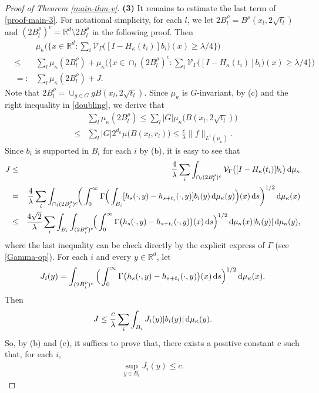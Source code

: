 \documentclass[11pt,a4paper]{article}
\def\R{\mathbb{R}}
\def\d{\textup{d}}
\theoremstyle{definition}\newtheorem{remark}[theorem]{Remark}
\begin{document}
\begin{proof}[Proof of Theorem \ref{main-thm-v}]
\textbf{(3)} It remains to estimate the last term of \eqref{proof-main-3}. For notational simplicity, for each $l$, we let $2B_l^\rho=B^\rho(x_l,2\sqrt{t_l})$ and $(2B_l^\rho)^c=\R^d\setminus 2B_l^\rho$ in the following proof. Then
\begin{eqnarray*}
&&\mu_\kappa\Big(\Big\{x\in\R^d: \sum_i\mathcal{V}_{\Gamma}\big([I-H_\kappa(t_i)]b_i)(x)\geq \lambda/4\Big\}\Big)\\
&\leq&\sum_l\mu_\kappa(2B_l^\rho)+\mu_\kappa\Big(\Big\{x\in\cap_l (2B_l^\rho)^c: \sum_i\mathcal{V}_{\Gamma}\big([I-H_\kappa(t_i)]b_i)(x)\geq \lambda/4\Big\}\Big)\\
&=:&\sum_l\mu_\kappa(2B_l^\rho)+J.
\end{eqnarray*}
Note that $2B_l^\rho=\cup_{g\in G}gB(x_l,2\sqrt{t_l})$. Since $\mu_\kappa$ is $G$-invariant, by (c) and the right inequality in \eqref{doubling}, we derive that
\begin{eqnarray*}
&&\sum_l\mu_\kappa(2B_l^\rho)\leq \sum_l|G|\mu_\kappa\big(B(x_l,2\sqrt{t_l})\big)\\
&\leq&\sum_l|G| 2^{d_\kappa}\mu\big(B(x_l,r_l)\big)\leq \frac{c}{\lambda}\|f\|_{L^1(\mu_\kappa)}.
\end{eqnarray*}
Since $b_i$ is supported in $B_i$ for each $i$ by (b), it is easy to see that
\begin{eqnarray*}
J&\leq&\frac{4}{\lambda}\sum_i\int_{\cap_l(2B^\rho_l)^c}\mathcal{V}_\Gamma\big([I-H_\kappa(t_i)]b_i\big)\,\d\mu_\kappa\\
&=&\frac{4}{\lambda}\sum_i\int_{\cap_l(2B^\rho_l)^c}\!\!\bigg(\int_0^\infty \Gamma\Big(\int_{B_i}[h_s(\cdot,y)-h_{s+t_i}(\cdot,y)]b_i(y)\,\d\mu_\kappa(y)\Big)(x)\,\d s\bigg)^{1/2}\,\d\mu_\kappa(x)\\
&\leq&\frac{4\sqrt{2}}{\lambda}\sum_i \int_{B_i} \int_{(2B^\rho_i)^c}\!\! \Big(\int_0^\infty\Gamma\big( h_s(\cdot,y)- h_{s+t_i}(\cdot,y)\big)(x)\,\d s\Big)^{1/2}\,\d\mu_\kappa(x)   |b_i(y)|\,\d\mu_\kappa(y),
\end{eqnarray*}
where the last inequality can be check directly by the explicit express of $\Gamma$ (see \eqref{Gamma-op}). For each $i$ and every $y\in\R^d$, let
$$J_i(y)= \int_{(2B_i^\rho)^c}\Big(\int_0^\infty \Gamma\big( h_s(\cdot,y)- h_{s+t_i}(\cdot,y)\big)(x) \,\d s\Big)^{1/2}\,\d\mu_\kappa(x).$$
Then
$$J\leq\frac{c}{\lambda}\sum_i \int_{B_i}J_i(y) |b_i(y)|\,\d\mu_\kappa(y). $$
So, by (b) and (c), it suffices to prove that, there exists a positive constant $c$ such that, for each $i$,
\begin{eqnarray*}\label{proof-main-J}\sup_{y\in B_i}J_i(y)\leq c.\end{eqnarray*}


\end{proof}
\end{document}
